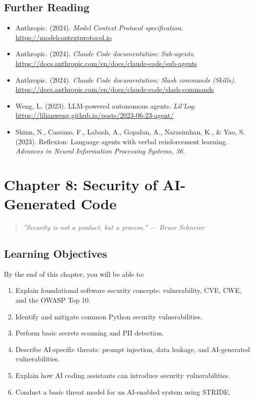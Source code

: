 \documentclass[11pt,a4paper]{book}
\begin{document}
\medskip

\section{Further Reading}

\begin{itemize}
  \item Anthropic. (2024). \textit{Model Context Protocol specification}. \url{https://modelcontextprotocol.io}
  \item Anthropic. (2024). \textit{Claude Code documentation: Sub-agents}. \url{https://docs.anthropic.com/en/docs/claude-code/sub-agents}
  \item Anthropic. (2024). \textit{Claude Code documentation: Slash commands (Skills)}. \url{https://docs.anthropic.com/en/docs/claude-code/slash-commands}
  \item Weng, L. (2023). LLM-powered autonomous agents. \textit{Lil'Log}. \url{https://lilianweng.github.io/posts/2023-06-23-agent/}
  \item Shinn, N., Cassano, F., Labash, A., Gopalan, A., Narasimhan, K., \& Yao, S. (2023). Reflexion: Language agents with verbal reinforcement learning. \textit{Advances in Neural Information Processing Systems, 36}.
\end{itemize}


\chapter{Chapter 8: Security of AI-Generated Code}

\begin{quote}
\textit{\textit{"Security is not a product, but a process."} --- Bruce Schneier}
\end{quote}

\medskip

\section{Learning Objectives}

By the end of this chapter, you will be able to:

\begin{enumerate}
  \item Explain foundational software security concepts: vulnerability, CVE, CWE, and the OWASP Top 10.
  \item Identify and mitigate common Python security vulnerabilities.
  \item Perform basic secrets scanning and PII detection.
  \item Describe AI-specific threats: prompt injection, data leakage, and AI-generated vulnerabilities.
  \item Explain how AI coding assistants can introduce security vulnerabilities.
  \item Conduct a basic threat model for an AI-enabled system using STRIDE.
\end{enumerate}
\end{document}
